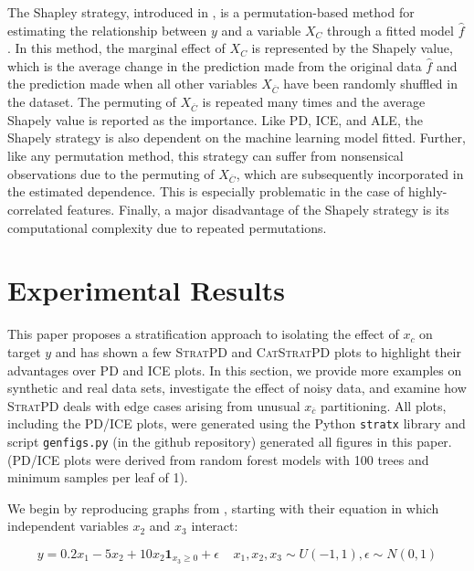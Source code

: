\documentclass[12pt]{article}
\newcommand{\spd}{\fontfamily{cmr}\textsc{\small StratPD}}
\newcommand{\cspd}{\fontfamily{cmr}\textsc{\small CatStratPD}}
\newcommand{\xnc}{$x_{\overline{c}}$}
\begin{document}
The Shapley strategy, introduced in \cite{lundberg2016unexpected}, is a permutation-based method for estimating the relationship between ${y}$ and a variable $X_C$ through a fitted model $\widehat{f}$. In this method, the marginal effect of $X_C$ is represented by the Shapely value, which is the average change in the prediction made from the original data $\widehat{f}$ and the prediction made when all other variables $X_{\overline{C}}$ have been randomly shuffled in the dataset. The permuting of $X_{\overline{C}}$ is repeated many times and the average Shapely value is reported as the importance. Like PD, ICE, and ALE, the Shapely strategy is also dependent on the machine learning model fitted. Further, like any permutation method, this strategy can suffer from nonsensical observations due to the permuting of $X_{\overline{C}}$, which are subsequently incorporated in the estimated dependence. This is especially problematic in the case of highly-correlated features. Finally, a major disadvantage of the Shapely strategy is its computational complexity due to repeated permutations. 
 
\section{Experimental Results}\label{sec:applications}

This paper proposes a stratification approach to isolating the effect of $x_c$ on target $y$ and has shown a few \spd{} and \cspd{} plots to highlight their advantages over PD and ICE plots. In this section, we provide more examples on synthetic and real data sets, investigate the effect of noisy data, and examine how \spd{} deals with edge cases arising from unusual \xnc{} partitioning.  All plots, including the PD/ICE plots, were generated using the Python {\tt stratx} library and script {\tt genfigs.py} (in the github repository) generated all figures in this paper. (PD/ICE plots were derived from random forest models with 100 trees and minimum samples per leaf of 1). 

We begin by reproducing graphs from \cite{ICE}, starting with their equation in which independent variables $x_2$ and $x_3$ interact:

\begin{equation}\label{eq:bigX}
y = 0.2x_1 - 5x_2 + 10x_2\mathbf{1}_{x_3 \geq 0} + \epsilon~~~~~x_1, x_2, x_3 \sim U(-1,1), \epsilon \sim N(0,1)
\end{equation}
\end{document}
